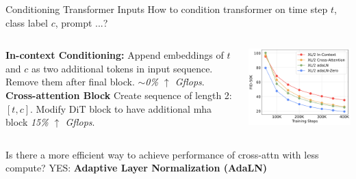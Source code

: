 \documentclass{beamer}
\begin{document}
\begin{frame}[t]{Conditioning Transformer Inputs}
    \vspace{-1.1em}
    How to condition transformer on time step $t$, class label $c$, prompt ...? \newline
	\begin{columns}[t]
		\begin{column}{.5\textwidth}
            \textbf{In-context Conditioning:}\newline
            Append embeddings of $t$ and $c$ as two additional tokens in input sequence.
            Remove them after final block.
            \textit{$\sim$0\% $\uparrow$ Gflops}.
            \newline
            \textbf{Cross-attention Block}\newline
            Create sequence of length 2: $[t,c]$. 
            Modify DiT block to have additional mha block
            \textit{15\% $\uparrow$ Gflops}.
		\end{column}
		\begin{column}{.5\textwidth}
            \begin{center}
                \includegraphics[width=1.0\textwidth]{./img/diff_arch_norm.png}
            \end{center}
		\end{column}
	\end{columns}
    Is there a more efficient way to achieve performance of cross-attn with less compute? \newline
    YES: \textbf{Adaptive Layer Normalization (AdaLN)} \newline
\end{frame}
\end{document}
